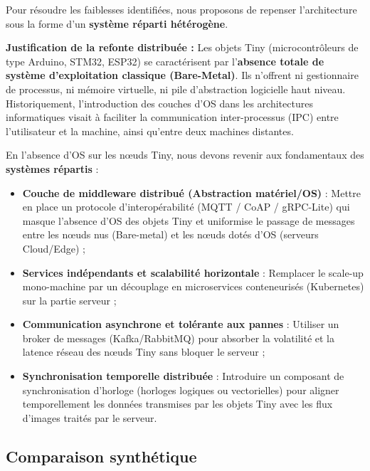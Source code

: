 \documentclass[11pt,a4paper]{article}
\begin{document}
Pour résoudre les faiblesses identifiées, nous proposons de repenser l'architecture sous la forme d'un \textbf{système réparti hétérogène}. 

\noindent \textbf{Justification de la refonte distribuée :} Les objets Tiny (microcontrôleurs de type Arduino, STM32, ESP32) se caractérisent par l'\textbf{absence totale de système d'exploitation classique (Bare-Metal)}. Ils n'offrent ni gestionnaire de processus, ni mémoire virtuelle, ni pile d'abstraction logicielle haut niveau. Historiquement, l'introduction des couches d'OS dans les architectures informatiques visait à faciliter la communication inter-processus (IPC) entre l'utilisateur et la machine, ainsi qu'entre deux machines distantes. 

En l'absence d'OS sur les nœuds Tiny, nous devons revenir aux fondamentaux des \textbf{systèmes répartis} :
\begin{itemize}
    \item \textbf{Couche de middleware distribué (Abstraction matériel/OS)} : Mettre en place un protocole d'interopérabilité (MQTT / CoAP / gRPC-Lite) qui masque l'absence d'OS des objets Tiny et uniformise le passage de messages entre les nœuds nus (Bare-metal) et les nœuds dotés d'OS (serveurs Cloud/Edge) ;
    \item \textbf{Services indépendants et scalabilité horizontale} : Remplacer le scale-up mono-machine par un découplage en microservices conteneurisés (Kubernetes) sur la partie serveur ;
    \item \textbf{Communication asynchrone et tolérante aux pannes} : Utiliser un broker de messages (Kafka/RabbitMQ) pour absorber la volatilité et la latence réseau des nœuds Tiny sans bloquer le serveur ;
    \item \textbf{Synchronisation temporelle distribuée} : Introduire un composant de synchronisation d'horloge (horloges logiques ou vectorielles) pour aligner temporellement les données transmises par les objets Tiny avec les flux d'images traités par le serveur.
\end{itemize}

\subsection{Comparaison synthétique}
\end{document}
